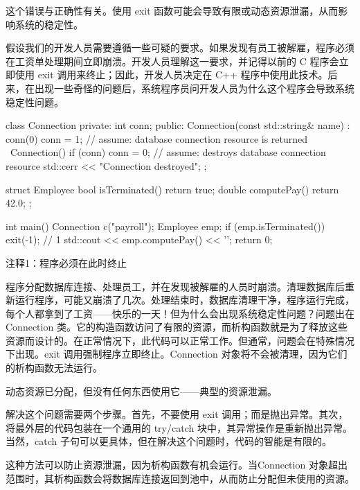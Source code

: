 这个错误与正确性有关。使用 exit 函数可能会导致有限或动态资源泄漏，从而影响系统的稳定性。


假设我们的开发人员需要遵循一些可疑的要求。如果发现有员工被解雇，程序必须在工资单处理期间立即崩溃。开发人员理解这一要求，并记得以前的 C 程序会立即使用 exit 调用来终止；因此，开发人员决定在 C++ 程序中使用此技术。后来，在出现一些奇怪的问题后，系统程序员问开发人员为什么这个程序会导致系统稳定性问题。


\begin{cpp}
class Connection {
private:
  int conn;
public:
  Connection(const std::string& name) : conn(0) {
    conn = 1; // assume: database connection resource is returned
  }
  ~Connection() {
    if (conn)
      conn = 0; // assume: destroys database connection resource
    std::cerr << "Connection destroyed\n";
  }
};

struct Employee {
  bool isTerminated() { return true; }
  double computePay() { return 42.0; }
};

int main() {
  Connection c("payroll");
  Employee emp;
  if (emp.isTerminated())
    exit(-1); // 1
  std::cout << emp.computePay() << '\n';
  return 0;
}
\end{cpp}

{\footnotesize
注释1：程序必须在此时终止
}


程序分配数据库连接、处理员工，并在发现被解雇的人员时崩溃。清理数据库后重新运行程序，可能又崩溃了几次。处理结束时，数据库清理干净，程序运行完成，每个人都拿到了工资——快乐的一天！但为什么会出现系统稳定性问题？问题出在 Connection 类。它的构造函数访问了有限的资源，而析构函数就是为了释放这些资源而设计的。在正常情况下，此代码可以正常工作。但通常，问题会在特殊情况下出现。exit 调用强制程序立即终止。Connection 对象将不会被清理，因为它们的析构函数无法运行。

动态资源已分配，但没有任何东西使用它——典型的资源泄漏。


解决这个问题需要两个步骤。首先，不要使用 exit 调用；而是抛出异常。其次，将最外层的代码包装在一个通用的 try/catch 块中，其异常操作是重新抛出异常。当然，catch 子句可以更具体，但在解决这个问题时，代码的智能是有限的。

这种方法可以防止资源泄漏，因为析构函数有机会运行。当Connection 对象超出范围时，其析构函数会将数据库连接返回到池中，从而防止分配但未使用的资源。

